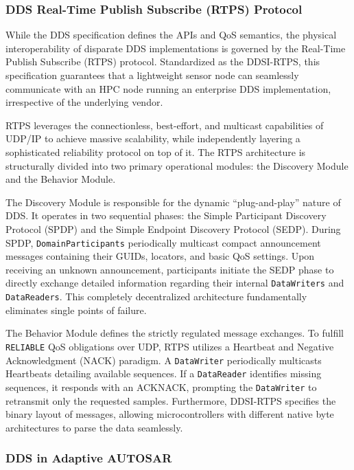 \subsubsection{DDS Real-Time Publish Subscribe (RTPS) Protocol}

While the DDS specification defines the APIs and QoS semantics, the physical interoperability of disparate DDS implementations is governed by the Real-Time Publish Subscribe (RTPS) protocol. Standardized as the DDSI-RTPS, this specification guarantees that a lightweight sensor node can seamlessly communicate with an HPC node running an enterprise DDS implementation, irrespective of the underlying vendor.

RTPS leverages the connectionless, best-effort, and multicast capabilities of UDP/IP to achieve massive scalability, while independently layering a sophisticated reliability protocol on top of it. The RTPS architecture is structurally divided into two primary operational modules: the Discovery Module and the Behavior Module.

The Discovery Module is responsible for the dynamic ``plug-and-play'' nature of DDS. It operates in two sequential phases: the Simple Participant Discovery Protocol (SPDP) and the Simple Endpoint Discovery Protocol (SEDP). During SPDP, \texttt{DomainParticipants} periodically multicast compact announcement messages containing their GUIDs, locators, and basic QoS settings. Upon receiving an unknown announcement, participants initiate the SEDP phase to directly exchange detailed information regarding their internal \texttt{DataWriters} and \texttt{DataReaders}. This completely decentralized architecture fundamentally eliminates single points of failure.

The Behavior Module defines the strictly regulated message exchanges. To fulfill \texttt{RELIABLE} QoS obligations over UDP, RTPS utilizes a Heartbeat and Negative Acknowledgment (NACK) paradigm. A \texttt{DataWriter} periodically multicasts Heartbeats detailing available sequences. If a \texttt{DataReader} identifies missing sequences, it responds with an ACKNACK, prompting the \texttt{DataWriter} to retransmit only the requested samples. Furthermore, DDSI-RTPS specifies the binary layout of messages, allowing microcontrollers with different native byte architectures to parse the data seamlessly.

\subsubsection{DDS in Adaptive AUTOSAR}

